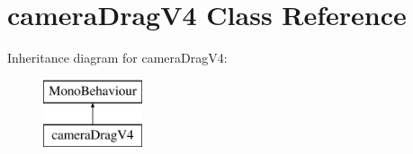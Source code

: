 \hypertarget{classcamera_drag_v4}{}\section{camera\+Drag\+V4 Class Reference}
\label{classcamera_drag_v4}
Inheritance diagram for camera\+Drag\+V4\+:\begin{figure}[H]
\begin{center}
\leavevmode
\includegraphics[height=2.000000cm]{classcamera_drag_v4}
\end{center}
\end{figure}
